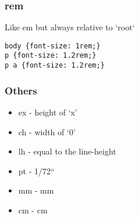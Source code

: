 \subsubsection{rem}

Like em but always relative to `root`

\begin{verbatim}
body {font-size: 1rem;}
p {font-size: 1.2rem;}
p a {font-size: 1.2rem;}
\end{verbatim}


\subsubsection{Others}

\begin{itemize}
    \item ex - height of ‘x’
    \item ch - width of ‘0’
    \item lh - equal to the line-height
    \item pt - 1/72“
    \item mm - mm
    \item cm - cm
\end{itemize}

